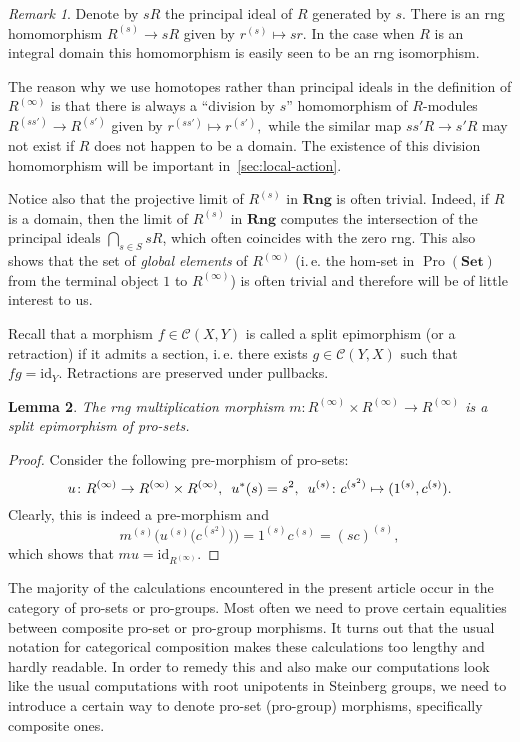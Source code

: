 \documentclass[oneside, 11pt]{amsart}
\numberwithin{equation}{section}
\newtheorem{lemma}{Lemma} \numberwithin{lemma}{section}
\theoremstyle{definition}
\theoremstyle{remark}
\newtheorem{rem}[lemma]{Remark}
\DeclareMathOperator{\Pro}{Pro}
\newcommand{\Set}{\mathbf{Set}}
\newcommand{\Rng}{\mathbf{Rng}}
\begin{document}
\begin{rem}\label{rem:prorings-comment}
 Denote by $sR$ the principal ideal of $R$ generated by $s$. 
 There is an rng homomorphism $R^{(s)} \to sR$ given by $r^{(s)}\mapsto sr$.
 In the case when $R$ is an integral domain this homomorphism is easily seen to be an rng isomorphism. 
 
 The reason why we use homotopes rather than principal ideals in the definition of $R^{(\infty)}$ is that
 there is always a ``division by $s$'' homomorphism of $R$-modules $R^{(ss')} \to R^{(s')}$ given by $r^{(ss')} \mapsto r^{(s')},$
 while the similar map $ss'R \to s'R$ may not exist if $R$ does not happen to be a domain.
 The existence of this division homomorphism will be important in~\cref{sec:local-action}.
 
 Notice also that the projective limit of $R^{(s)}$ in $\Rng$ is often trivial.
 Indeed, if $R$ is a domain, then the limit of $R^{(s)}$ in $\Rng$ computes the intersection of the principal ideals $\bigcap_{s\in S} sR$, which often coincides with the zero rng. 
 This also shows that the set of {\it global elements} of $R^{(\infty)}$ (i.\,e. the hom-set in $\Pro(\Set)$ from the terminal object $1$ to $R^{(\infty)}$) is often trivial and therefore will be of little interest to us.
\end{rem}

Recall that a morphism \(f \in \mathcal C(X, Y)\) is called a split epimorphism (or a retraction) if it admits a section,
 i.\,e. there exists $g \in \mathcal{C}(Y, X)$ such that $fg = \mathrm{id}_{Y}$. Retractions are preserved under pullbacks.

\begin{lemma}\label{RingGeneration}
The rng multiplication morphism $m \colon R^{(\infty)} \times R^{(\infty)} \to R^{(\infty)}$ is a split epimorphism of pro-sets.
\end{lemma}
\begin{proof}
Consider the following pre-morphism of pro-sets:
\[u \colon R^{(\infty)} \to R^{(\infty)} \times R^{(\infty)}, \enskip u^*(s) = s^2, \enskip u^{(s)} \colon c^{(s^2)} \mapsto (1^{(s)}, c^{(s)}).\]
Clearly, this is indeed a pre-morphism and
\[m^{(s)}\bigl(u^{(s)}\bigl(c^{(s^2)}\bigr)\bigr) = 1^{(s)} c^{(s)} = (sc)^{(s)},\]
which shows that $mu = \mathrm{id}_{R^{(\infty)}}$.
\end{proof}

The majority of the calculations encountered in the present article occur in the category of pro-sets or pro-groups.
Most often we need to prove certain equalities between composite pro-set or pro-group morphisms.
It turns out that the usual notation for categorical composition makes these calculations too lengthy and hardly readable. In order to remedy this and also make our computations look like the usual computations with root unipotents in Steinberg groups, we need to introduce a certain way to denote pro-set (pro-group) morphisms, specifically composite ones.
\end{document}
